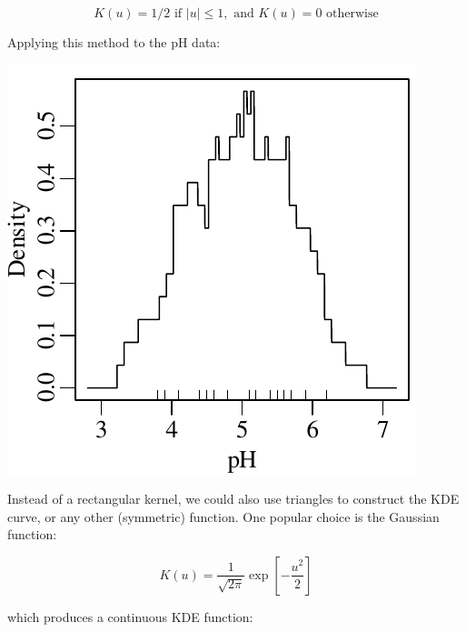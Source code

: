 \begin{equation}
  K(u) = 1/2 \mbox{~if~}|u| \leq 1, \mbox{~and~} K(u) = 0 \mbox{~otherwise}
\end{equation}

Applying this method to the pH data:

\noindent\begin{minipage}[t][][b]{.3\textwidth}
  \includegraphics[width=\textwidth]{../figures/pHrectKDE.pdf}
\end{minipage}
\begin{minipage}[t][][t]{.7\textwidth}
  \label{fig:pHrectKDE}
\end{minipage}

Instead of a rectangular kernel, we could also use triangles to
construct the KDE curve, or any other (symmetric) function. One
popular choice is the Gaussian function:

\begin{equation}
  K(u) = \frac{1}{\sqrt{2\pi}}\exp\!\left[-\frac{u^2}{2}\right]
  \label{eq:gaussiankernel}
\end{equation}

\noindent which produces a continuous KDE function:\medskip

